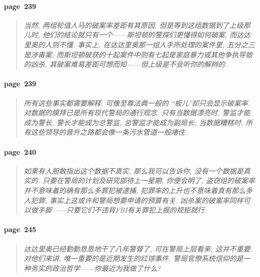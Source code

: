 \paragraph*{page~239}
\begin{quotation}
    \itshape
    当然, 两组轮值人马的破案率差距有其原因, 但是等到这组数据到了上级那儿时, 他们的结论就只有一个------斯坦顿的警探们更懂得如何破案, 而达达里奥的人则不懂. 事实上, 在达达里奥那一组人手所处理的案件里, 五分之三是涉毒案; 而斯坦顿破获的十起案件中则有七起是家庭暴力或其他争执导致的凶杀, 其破案难易差距可想而知------但上级是不会听你的解辫的. 
\end{quotation}

\paragraph*{page~239}
\begin{quotation}
    \itshape
    所有这些事实都需要解释. 可像至尊法典一般的 ``板儿''却只会显示破案率. 对数据的膜拜已是所有现代警局的通行观念. 只有当数据漂亮时, 警监才能成为警长, 警长才能成为总警监, 总警监才能成为副局长; 当数据糟糕时, 所有这些领导的晋升之路都会像一条污水管道一般堵住. 
\end{quotation}

\paragraph*{page~240}
\begin{quotation}
    \itshape
    如果有人胆敢指出这个数据不真实, 那么我可以告诉你, 没有一个数据是真实的. 只要在警局的计划及研究部待上一星期, 你便会明了, 盗窃组的破案率并不意味着的确有那么多罪犯被逮捕, 犯罪率的上升也不意味着真有那么多人犯罪, 事实上这或许和警局想要申请的预算有关. 凶杀案的破案率同样可以做手脚------只要它们不违背FBI有关罪犯上报的规矩就行. 
\end{quotation}

\paragraph*{page~245}
\begin{quotation}
    \itshape
    达达里奥已经勤勤恳恳地干了八年警督了, 可在警局上层看来, 这并不重要. 对他们来讲, 唯一重要的是近期发生的红球事件. 警局官僚系统信仰的是一种务实的政治哲学------你最近为我做了什么? 
\end{quotation}

